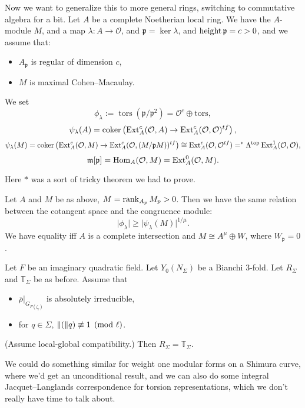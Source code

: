 \documentclass[reqno]{amsart} 
\begin{document}
Now we want to generalize this to more general rings, switching to commutative algebra for a bit.  Let $A$ be a complete Noetherian local ring.  We have the $A$-module $M$, and a map $\lambda : A \rightarrow \mathcal{O}$, and $\mathfrak{p} = \ker \lambda$, and $\operatorname{height} \mathfrak{p} = c > 0$, and we assume that:
\begin{itemize}
\item $A_{\mathfrak{p}}$ is regular of dimension $c$, 
\item $M$ is maximal Cohen--Macaulay.
\end{itemize}
We set
\begin{equation*}
  \phi_\lambda := \operatorname{tors}(\mathfrak{p} / \mathfrak{p}^2) = \mathcal{O}^{c} \oplus \mathrm{tors},
\end{equation*}
\begin{equation*}
  \psi_\lambda(A) = \operatorname{coker} \left( \operatorname{Ext}_A^{c}(\mathcal{O}, A)
    \rightarrow \operatorname{Ext}_{A}^{c}(\mathcal{O}, \mathcal{O})^{tf}\right),
\end{equation*}
\begin{equation*}
  \psi_\lambda(M) = \operatorname{coker} \left( \operatorname{Ext}_{A}^{c}(\mathcal{O}, M) \rightarrow \operatorname{Ext}_{A}^{c}(\mathcal{O},(M / \mathfrak{p} M))^{t f} \right) \cong \operatorname{Ext}^{c}_A(\mathcal{O}, \mathcal{O}^{t f})
  =^* \Lambda^{\text{top}} \operatorname{Ext}_A^1(\mathcal{O}, \mathcal{O}),
\end{equation*}
\begin{equation*}
  \mathfrak{m}[\mathfrak{p}] = \operatorname{Hom}_{A}(\mathcal{O}, M) = \operatorname{Ext}_A^0(\mathcal{O}, M).
\end{equation*}

Here $\ast$ was a sort of tricky theorem we had to prove.

\begin{theorem}[IKM]
  Let $A$ and $M$ be as above, $M = \operatorname{rank}_{A_p} M_p > 0$.  Then we have the same relation between the cotangent space and the congruence module:
  \begin{equation*}
    \lvert \phi_\lambda \rvert \geq \lvert \psi_\lambda(M) \rvert^{1 / \mu}.
  \end{equation*}
  We have equality iff $A$ is a complete intersection and $M \cong A^\mu \oplus W$, where $W_{\mathfrak{p}} = 0$.
\end{theorem}

\begin{theorem}
  Let $F$ be an imaginary quadratic field.  Let $Y_0(N_\Sigma)$ be a Bianchi $3$-fold.  Let $R_{\Sigma}$ and $\mathbb{T}_{\Sigma}$ be as before.  Assume that
  \begin{itemize}
  \item $\bar{\rho}|_{G_{F(\zeta_{\ell})}}$ is absolutely irreducible,
  \item for $q \in \Sigma$, $\lVert(\rVert q) \not \equiv 1 \pmod{\ell}$.
  \end{itemize}
  (Assume local-global compatibility.)  Then $R_{\Sigma} = \mathbb{T}_{\Sigma}$.
\end{theorem}
We could do something similar for weight one modular forms on a Shimura curve, where we'd get an unconditional result, and we can also do some integral Jacquet--Langlands correspondence for torsion representations, which we don't really have time to talk about.
\end{document}

